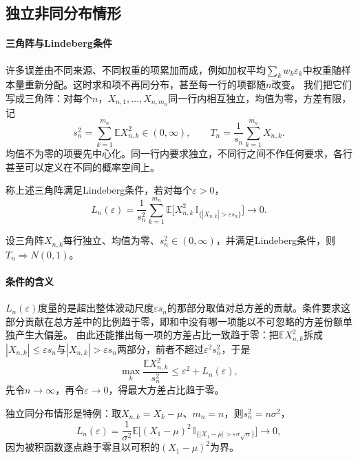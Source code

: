 \subsection{独立非同分布情形}

\paragraph{三角阵与Lindeberg条件}
许多误差由不同来源、不同权重的项累加而成，例如加权平均$\sum_kw_k\varepsilon_k$中权重随样本量重新分配。这时求和项不再同分布，甚至每一行的项都随$n$改变。
我们把它们写成三角阵：对每个$n$，$X_{n,1},\ldots,X_{n,m_n}$同一行内相互独立，均值为零，方差有限，记
\[
  s_n^2=\sum_{k=1}^{m_n}\mathbb E X_{n,k}^2\in(0,\infty),\qquad T_n=\frac1{s_n}\sum_{k=1}^{m_n}X_{n,k}.
\]
均值不为零的项要先中心化。同一行内要求独立，不同行之间不作任何要求，各行甚至可以定义在不同的概率空间上。

\begin{definition}
\label{def:wlim-lindeberg-condition}
称上述三角阵满足Lindeberg条件，若对每个$\varepsilon>0$，
\[
  L_n(\varepsilon)=\frac1{s_n^2}\sum_{k=1}^{m_n}\mathbb E\bigl[X_{n,k}^2\,\mathbb I_{\{|X_{n,k}|>\varepsilon s_n\}}\bigr]\to0.
\]
\end{definition}

\begin{theorem}[Lindeberg中心极限定理]
\label{thm:wlim-lindeberg}
设三角阵$X_{n,k}$每行独立、均值为零、$s_n^2\in(0,\infty)$，并满足Lindeberg条件，则$T_n\Rightarrow N(0,1)$。
\end{theorem}

\paragraph{条件的含义}
$L_n(\varepsilon)$度量的是超出整体波动尺度$\varepsilon s_n$的那部分取值对总方差的贡献。条件要求这部分贡献在总方差中的比例趋于零，即和中没有哪一项能以不可忽略的方差份额单独产生大偏差。
由此还能推出每一项的方差占比一致趋于零：把$\mathbb E X_{n,k}^2$拆成$|X_{n,k}|\leq\varepsilon s_n$与$|X_{n,k}|>\varepsilon s_n$两部分，前者不超过$\varepsilon^2s_n^2$，于是
\begin{equation}
  \max_k\frac{\mathbb E X_{n,k}^2}{s_n^2}\leq\varepsilon^2+L_n(\varepsilon),
  \label{eq:wlim-max-share}
\end{equation}
先令$n\to\infty$，再令$\varepsilon\to0$，得最大方差占比趋于零。

独立同分布情形是特例：取$X_{n,k}=X_k-\mu$、$m_n=n$，则$s_n^2=n\sigma^2$，
\[
  L_n(\varepsilon)=\frac1{\sigma^2}\mathbb E\bigl[(X_1-\mu)^2\,\mathbb I_{\{|X_1-\mu|>\varepsilon\sigma\sqrt n\}}\bigr]\to0,
\]
因为被积函数逐点趋于零且以可积的$(X_1-\mu)^2$为界。

